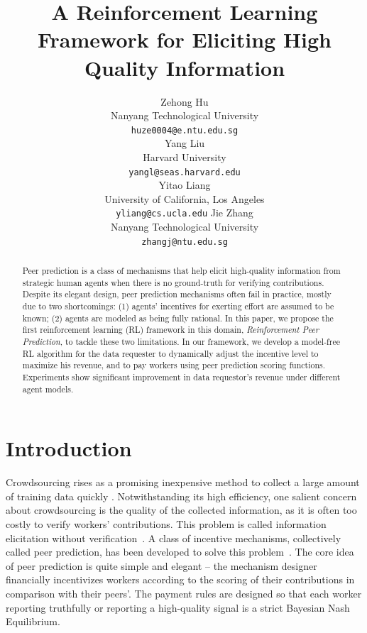 \documentclass{article}
\title{A Reinforcement Learning Framework for Eliciting High Quality Information}
\author{
  Zehong Hu \\
  Nanyang Technological University\\
  \texttt{huze0004@e.ntu.edu.sg} \\
  \And
  Yang Liu \\
  Harvard University \\
  \texttt{yangl@seas.harvard.edu}\\
  \And
  Yitao Liang \\
  University of California, Los Angeles \\
  \texttt{yliang@cs.ucla.edu}
   \And
  Jie Zhang \\
  Nanyang Technological University \\
  \texttt{zhangj@ntu.edu.sg}
}
\begin{document}

\maketitle

\begin{abstract}
Peer prediction is a class of mechanisms that help elicit high-quality information from strategic human agents when there is no ground-truth for verifying contributions. Despite its elegant design, peer prediction mechanisms often fail in practice, mostly due to two shortcomings: (1) agents' incentives for exerting effort %
are assumed to be known;
 (2) agents are modeled as being fully rational. In this paper, we propose the first reinforcement learning (RL) framework in this domain, \emph{Reinforcement Peer Prediction}, to tackle these two limitations.  %
In our framework, we develop a model-free RL algorithm for the data requester to dynamically adjust the incentive level to maximize his revenue, and to pay workers using peer prediction scoring functions. 
 Experiments show significant improvement in data requestor's revenue under different agent models.
\end{abstract}

\section{Introduction}
Crowdsourcing rises as a promising inexpensive method to collect a large amount of training data %
quickly \cite{snow2008cheap,deng2009imagenet}.
Notwithstanding its high efficiency, one salient concern about crowdsourcing is the quality of the collected information, as it is often too costly to verify workers' contributions.
This problem is called information elicitation without verification~\cite{waggoner2014output}.
A class of incentive mechanisms, collectively called peer prediction, has been developed to solve this problem~\cite{miller2005eliciting,jurca2009mechanisms,witkowski2012robust,witkowski2012peer,radanovic2013robust}.
The core idea of peer prediction is quite simple and elegant -- the mechanism designer financially incentivizes 
workers according to the scoring of their contributions in comparison with their peers'. The payment rules are designed so that each worker reporting truthfully or reporting a high-quality signal is a strict Bayesian Nash Equilibrium.
\end{document}
